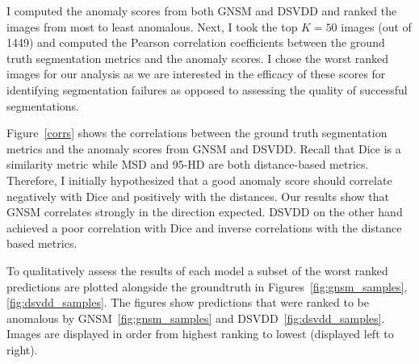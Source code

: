 

I computed the anomaly scores from both GNSM and DSVDD and ranked the images from most to least anomalous. Next, I took the top $K=50$ images (out of 1449) and computed the  Pearson correlation coefficients between the ground truth segmentation metrics and the anomaly scores. I chose the worst ranked images for our analysis as we are interested in the efficacy of these scores for identifying segmentation failures as opposed to assessing the quality of successful segmentations.

Figure~\ref{corrs} shows the correlations between the ground truth segmentation metrics and the anomaly scores from GNSM and DSVDD.  Recall that Dice is a similarity metric while MSD and 95-HD are both distance-based metrics. Therefore, I initially hypothesized that a good anomaly score should correlate negatively with Dice and positively with the distances. Our results show that GNSM correlates strongly in the direction expected. DSVDD on the other hand achieved a poor correlation with Dice and inverse correlations with the distance based metrics.

To qualitatively assess the results of each model a subset of the worst ranked predictions are plotted alongside the groundtruth in Figures~\ref{fig:gnsm_samples},\ref{fig:dsvdd_samples}.
The figures show predictions that were ranked to be anomalous by GNSM~\ref{fig:gnsm_samples} and DSVDD~\ref{fig:dsvdd_samples}. Images are displayed in order from highest ranking to lowest (displayed left to right).

